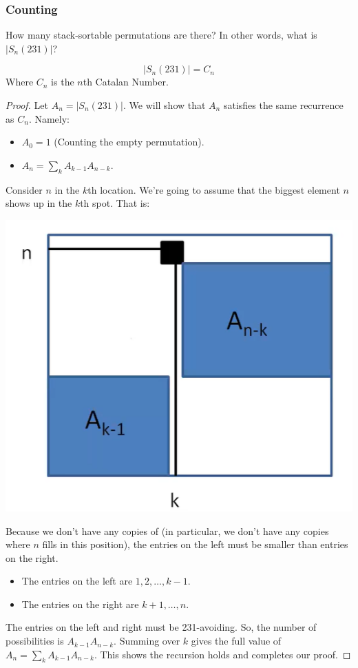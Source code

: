 \documentclass[letterpaper]{article}
\begin{document}
\subsubsection{Counting}
How many stack-sortable permutations are there? In other words, what is $|S_{n}(231)|$? 
\begin{theorem}{}{}
    \[|S_{n}(231)| = C_n\]
    Where $C_n$ is the $n$th Catalan Number.
\end{theorem}
\begin{proof}
    Let $A_{n} = |S_{n}(231)|$. We will show that $A_n$ satisfies the same recurrence as $C_n$. Namely:
    \begin{itemize}
        \item $A_0 = 1$ (Counting the empty permutation).
        \item $A_n = \sum_{k} A_{k - 1} A_{n - k}$. 
    \end{itemize}
    Consider $n$ in the $k$th location. We're going to assume that the biggest element $n$ shows up in the $k$th spot. That is:
    \begin{center}
        \includegraphics[scale=0.3]{layout_perm.PNG}
    \end{center}
    Because we don't have any copies of  (in particular, we don't have any copies where $n$ fills in this  position), the entries on the left must be smaller than entries on the right.
    \begin{itemize}
        \item The entries on the left are $1, 2, \dots, k - 1$.
        \item The entries on the right are $k + 1, \dots, n$. 
    \end{itemize} 
    The entries on the left and right must be 231-avoiding. So, the number of possibilities is $A_{k - 1}A_{n - k}$. Summing over $k$ gives the full value of $A_n = \sum_{k} A_{k - 1}A_{n - k}$. This shows the recursion holds and completes our proof.  
\end{proof}
\end{document}
